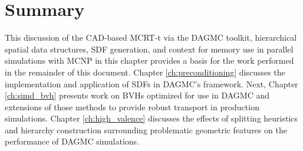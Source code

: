 \section{Summary}

This discussion of the CAD-based MCRT-t via the DAGMC toolkit, hierarchical
spatial data structures, SDF generation, and context for memory use in parallel
simulations with MCNP in this chapter provides a basis for the work performed in
the remainder of this document. Chapter
\ref{ch:preconditioning} discusses the implementation and application of SDFs in
DAGMC's framework. Next, Chapter \ref{ch:simd_bvh} presents work on BVHs
optimized for use in DAGMC and extensions of those methods to provide robust
transport in production simulations. Chapter \ref{ch:high_valence} discusses the
effects of splitting heuristics and hierarchy construction surrounding
problematic geometric features on the performance of DAGMC simulations.
